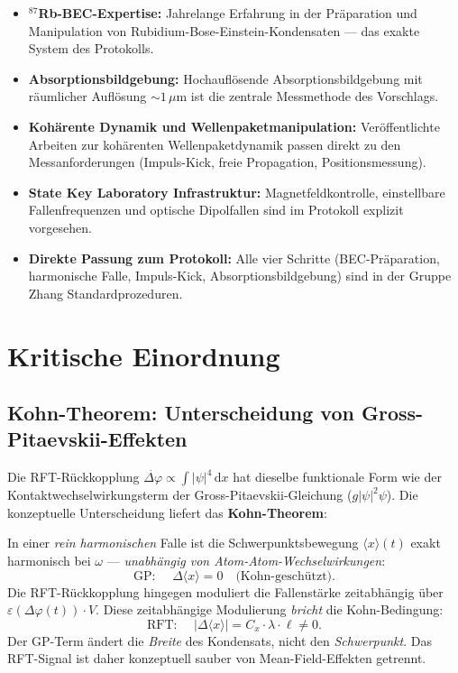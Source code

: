 \documentclass[a4paper,11pt]{article}
\begin{document}
\begin{itemize}
  \item \textbf{$^{87}$Rb-BEC-Expertise:} Jahrelange Erfahrung in der
    Präparation und Manipulation von Rubidium-Bose-Einstein-Kondensaten ---
    das exakte System des Protokolls.
  \item \textbf{Absorptionsbildgebung:} Hochauflösende Absorptionsbildgebung
    mit räumlicher Auflösung $\sim 1\,\mu\mathrm{m}$ ist die zentrale
    Messmethode des Vorschlags.
  \item \textbf{Kohärente Dynamik und Wellenpaketmanipulation:}
    Veröffentlichte Arbeiten zur kohärenten Wellenpaketdynamik passen
    direkt zu den Mess\-anforderungen (Impuls-Kick, freie Propagation,
    Positionsmessung).
  \item \textbf{State Key Laboratory Infrastruktur:} Magnetfeldkontrolle,
    einstellbare Fallenfrequenzen und optische Dipolfallen sind im Protokoll
    explizit vorgesehen.
  \item \textbf{Direkte Passung zum Protokoll:} Alle vier Schritte
    (BEC-Präparation, harmonische Falle, Impuls-Kick, Absorptionsbildgebung)
    sind in der Gruppe Zhang Standardprozeduren.
\end{itemize}

\section{Kritische Einordnung}

\subsection{Kohn-Theorem: Unterscheidung von Gross-Pitaevskii-Effekten}

Die RFT-Rückkopplung $\dot{\Delta\varphi} \propto \int |\psi|^4\,\mathrm{d}x$
hat dieselbe funktionale Form wie der Kontaktwechselwirkungsterm der
Gross-Pitaevskii-Gleichung ($g|\psi|^2\psi$). Die konzeptuelle Unterscheidung
liefert das \textbf{Kohn-Theorem}:

In einer \emph{rein harmonischen} Falle ist die Schwerpunktsbewegung
$\langle x\rangle(t)$ exakt harmonisch bei $\omega$ ---
\emph{unabhängig von Atom-Atom-Wechselwirkungen}:
\[
  \text{GP: } \quad \Delta\langle x\rangle = 0 \quad\text{(Kohn-geschützt)}.
\]
Die RFT-Rückkopplung hingegen moduliert die Fallenstärke zeitabhängig
über $\varepsilon(\Delta\varphi(t)) \cdot V$. Diese zeitabhängige Modulierung
\emph{bricht} die Kohn-Bedingung:
\[
  \text{RFT: } \quad |\Delta\langle x\rangle| = C_x \cdot \lambda \cdot \ell \neq 0.
\]
Der GP-Term ändert die \emph{Breite} des Kondensats, nicht den
\emph{Schwerpunkt}. Das RFT-Signal ist daher konzeptuell sauber
von Mean-Field-Effekten getrennt.
\end{document}
